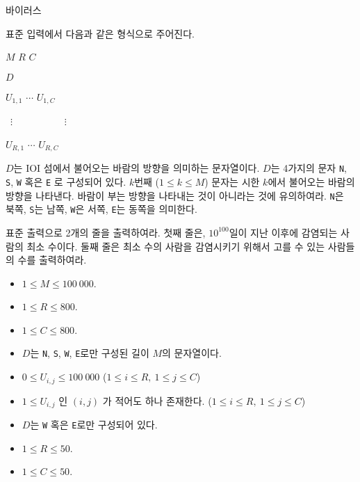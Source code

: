 \begin{problem}{바이러스}
	
	\InputFile
	
	표준 입력에서 다음과 같은 형식으로 주어진다. 
	
	$M$ $R$ $C$
	
	$D$
	
	$U_{1, 1}$ $\cdots$ $U_{1, C}$

	\ $\vdots$ \ \ \ \ \ \ \ \ \ \ $\vdots$	
	
	$U_{R, 1}$ $\cdots$ $U_{R, C}$
	
	$D$는 IOI 섬에서 불어오는 바람의 방향을 의미하는 문자열이다. $D$는 4가지의 문자 \texttt{N}, \texttt{S}, \texttt{W} 혹은 \texttt{E} 로 구성되어 있다. $k$번째 ($1 \le k \le M$) 문자는 시한 $k$에서 불어오는 바람의 방향을 나타낸다. 바람이 부는 방향을 나타내는 것이 아니라는 것에 유의하여라. \texttt{N}은 북쪽, \texttt{S}는 남쪽, \texttt{W}은 서쪽, \texttt{E}는 동쪽을 의미한다.
	
	\OutputFile
	
	표준 출력으로 2개의 줄을 출력하여라.
	첫째 줄은, $10^{100}$일이 지난 이후에 감염되는 사람의 최소 수이다. 둘째 줄은 최소 수의 사람을 감염시키기 위해서 고를 수 있는 사람들의 수를 출력하여라.
	
	\Constraints
	
	\begin{itemize}
		
		\item $1 \le M \le 100\ 000$.
		\item $1 \le R \le 800$.
		\item $1 \le C \le 800$.
		\item $D$는 \texttt{N}, \texttt{S}, \texttt{W}, \texttt{E}로만 구성된 길이 $M$의 문자열이다.
		\item $0 \le U_{i, j} \le 100\ 000$ ($1 \le i \le R, \ 1 \le j \le C$)
		\item $1 \le U_{i, j}$ 인 $(i, j)$ 가 적어도 하나 존재한다. ($1 \le i \le R, \ 1 \le j \le C$)
	\end{itemize}
	
	
	\begin{itemize}
		\item $D$는 \texttt{W} 혹은 \texttt{E}로만 구성되어 있다.
	\end{itemize}
	
	\begin{itemize}
		\item $1 \le R \le 50$.
		\item $1 \le C \le 50$.
	\end{itemize}
	

\end{problem}

